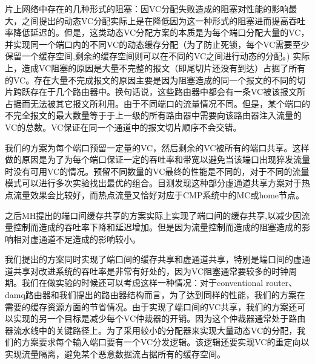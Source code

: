 \documentclass[10pt,journal]{IEEEtran}
\begin{document}
片上网络中存在的几种形式的阻塞：因VC分配失败造成的阻塞对性能的影响最大，之间提出的动态VC分配实际上是在降低因为这一种形式的阻塞进而提高吞吐率降低延迟的。但是，这类动态VC分配方案的本质是为每个端口分配大量的VC，并实现同一个端口内的不同VC的动态缓存分配（为了防止死锁，每个VC需要至少保留一个缓存空间,剩余的缓存空间则可以在不同的VC之间进行动态的分配。) 实际上，造成VC阻塞的原因是大量不完整的报文（即尾切片还没有到达）占据了所有的VC。存在大量不完成报文的原因主要是因为阻塞造成的同一个报文的不同的切片跨跃存在于几个路由器中。换句话说，这些路由器中都会有一条VC被该报文所占据而无法被其它报文所利用。由于不同端口的流量情况不同。但是，某个端口的不完全报文的最大数量等于于上一级的所有路由器中需要向该路由器注入流量的VC的总数。VC保证在同一个通道中的报文切片顺序不会交错。

我们的方案为每个端口预留一定量的VC，然后剩余的VC被所有的端口共享。这样做的原因是为了为每个端口保证一定的吞吐率和带宽以避免当该端口出现猝发流量时没有可用VC的情况。预留不同数量的VC最终的性能是不同的，对于不同的流量模式可以进行多次实验找出最优的组合。目测发现这种部分虚通道共享方案对于热点流量效果会比较好，而热点流量又恰好对应于CMP系统中的MC或home节点。

之后MH提出的端口间缓存共享的方案实际上实现了端口间的缓存共享,以减少因流量控制而造成的吞吐率下降和延迟增加。但是因为流量控制而造成的阻塞造成的影响相对虚通道不足造成的影响较小。

我们提出的方案同时实现了端口间的缓存共享和虚通道共享，特别是端口间的虚通道共享对改进系统的吞吐率是非常有好处的，因为VC阻塞通常要较多的时钟周期。我们在做实验的时候还可以考虑这样一种情况：对于conventional router、damq路由器和我们提出的路由器结构而言，为了达到同样的性能，我们的方案在需要的缓存资源方面的节省情况。由于实现了端口间的VC共享，我们的方案还可以实现的另一个目标是减少每个VC仲裁器的开销。因为这个仲裁器通常处于路由器流水线中的关键路径上。为了采用较小的分配器来实现大量动态VC的分配，我们的方案要求每个输入端口要有一个VC分发逻辑。该逻辑还要实现VC的重定向以实现流量隔离，避免某个恶意数据流占据所有的缓存空间。
\end{document}
